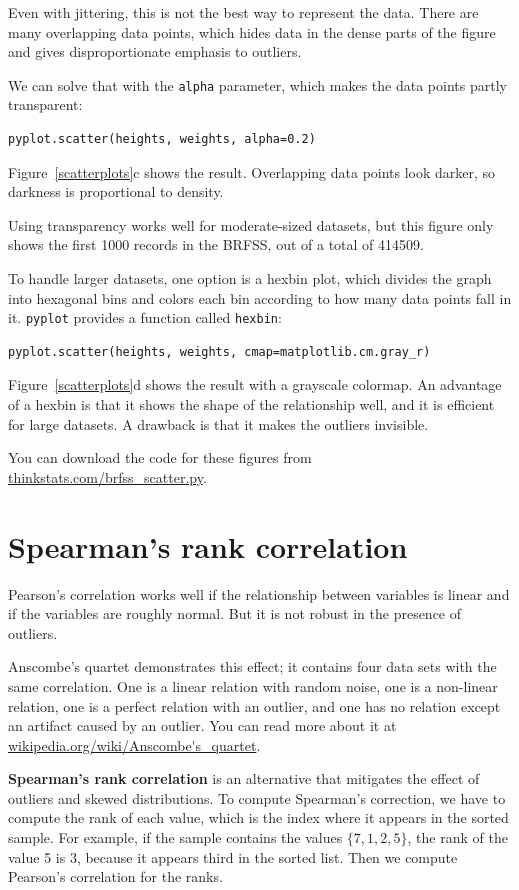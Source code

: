\documentclass[12pt]{book}
\begin{document}
Even with jittering, this is not the best way to represent the data.
There are many overlapping data points, which hides data
in the dense parts of the figure and gives disproportionate emphasis
to outliers.

We can solve that with the {\tt alpha} parameter, which makes
the data points partly transparent:
%
\begin{verbatim}
pyplot.scatter(heights, weights, alpha=0.2)
\end{verbatim}
%
Figure~\ref{scatterplots}c shows the result.  Overlapping data points
look darker, so darkness is proportional to density.

Using transparency works well for moderate-sized datasets, but this
figure only shows the first 1000 records in the BRFSS, out of a total
of 414509.

To handle larger datasets, one option is a hexbin plot, which divides
the graph into hexagonal bins and colors each bin according to how many
data points fall in it.  {\tt pyplot} provides a function called 
{\tt hexbin}:
%
\begin{verbatim}
pyplot.scatter(heights, weights, cmap=matplotlib.cm.gray_r)
\end{verbatim}
%
Figure~\ref{scatterplots}d shows the result with a grayscale colormap.
An advantage of a hexbin is that it shows the shape of the relationship
well, and it is efficient for large datasets.  A drawback is that
it makes the outliers invisible.

You can download the code for these figures from
\url{thinkstats.com/brfss_scatter.py}.


\section{Spearman's rank correlation}

Pearson's correlation works well if the relationship between variables
is linear and if the variables are roughly normal.  But it is not
robust in the presence of outliers.

Anscombe's quartet demonstrates this effect; it contains four data
sets with the same correlation.  One is a linear relation with random
noise, one is a non-linear relation, one is a perfect relation with an
outlier, and one has no relation except an artifact caused by an
outlier.  You can read more about it at
\url{wikipedia.org/wiki/Anscombe's_quartet}.

{\bf Spearman's rank correlation} is an alternative that mitigates the
effect of outliers and skewed distributions.  To compute Spearman's
correction, we have to compute the rank of each value, which is the
index where it appears in the sorted sample.  For example, if the
sample contains the values $\{ 7, 1, 2, 5 \}$, the rank of the value 5
is 3, because it appears third in the sorted list.  Then we compute
Pearson's correlation for the ranks.
\end{document}
